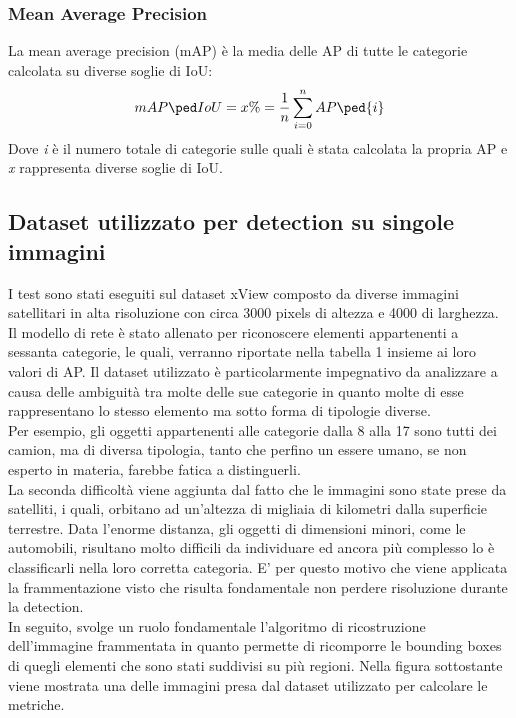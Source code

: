 \subsubsection{Mean Average Precision}
La mean average precision (mAP) è la media delle AP di tutte le categorie calcolata su diverse soglie di IoU:
\[
    mAP\ped{IoU=x\%} = \frac{1}{n}\sum_{i=0}^{n}AP\ped{i}
\]
Dove \textit{i} è il numero totale di categorie sulle quali è stata calcolata la propria AP e \textit{x} rappresenta diverse soglie di IoU.

\subsection{Dataset utilizzato per detection su singole immagini}
I test sono stati eseguiti sul dataset xView composto da diverse immagini satellitari in alta risoluzione con circa 3000 pixels di altezza e 4000 di larghezza. Il modello di rete è stato allenato per riconoscere elementi appartenenti a sessanta categorie, le quali, verranno riportate nella tabella 1 insieme ai loro valori di AP. Il dataset utilizzato è particolarmente impegnativo da analizzare a causa delle ambiguità tra molte delle sue categorie in quanto molte di esse rappresentano lo stesso elemento ma sotto forma di tipologie diverse.\\
Per esempio, gli oggetti appartenenti alle categorie dalla 8 alla 17 sono tutti dei camion, ma di diversa tipologia, tanto che perfino un essere umano, se non esperto in materia, farebbe fatica a distinguerli.\\
La seconda difficoltà viene aggiunta dal fatto che le immagini sono state prese da satelliti, i quali, orbitano ad un'altezza di migliaia di kilometri dalla superficie terrestre. Data l'enorme distanza, gli oggetti di dimensioni minori, come le automobili, risultano molto difficili da individuare ed ancora più complesso lo è classificarli nella loro corretta categoria. E' per questo motivo che viene applicata la frammentazione visto che risulta fondamentale non perdere risoluzione durante la detection.\\
In seguito, svolge un ruolo fondamentale l'algoritmo di ricostruzione dell'immagine frammentata in quanto permette di ricomporre le bounding boxes di quegli elementi che sono stati suddivisi su più regioni. Nella figura sottostante viene mostrata una delle immagini presa dal dataset utilizzato per calcolare le metriche.
